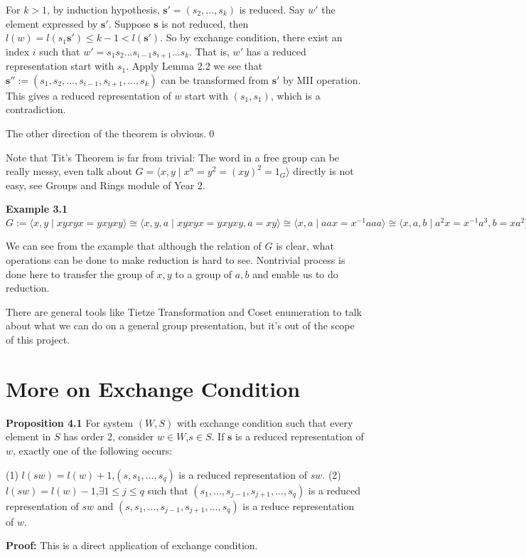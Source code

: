 \documentclass[../main.tex]{subfiles}
\begin{document}
For $k>1$, by induction hypothesis, $\mathbf{s'}=(s_2,...,s_k)$ is reduced. Say $w'$ the element expressed by $\mathbf{s'}$. Suppose $\mathbf{s}$ is not reduced, then $l(w)=l(s_1\mathbf{s'})\le k-1 < l(\mathbf{s'})$. So by exchange condition, there exist an index $i$ such that $w'=s_1s_2...s_{i-1}s_{i+1}...s_k$. That is, $w'$ has a reduced representation start with $s_1$. Apply Lemma 2.2 we see that $\mathbf{s''}:=(s_1,s_2,...,s_{i-1},s_{i+1},...,s_k)$ can be transformed from $\mathbf{s'}$ by MII operation. This gives a reduced representation of $w$ start with $(s_1,s_1)$, which is a contradiction. 

The other direction of the theorem is obvious.\qed

\vspace{\baselineskip}
Note that Tit's Theorem is far from trivial: The word in a free group can be really messy, even talk about $G=\langle x,y \mid x^n=y^2=(xy)^2=1_G \rangle$ directly is not easy, see Groups and Rings module of Year 2. 

\vspace{\baselineskip}
\noindent \textbf{Example 3.1} $G:=\langle x,y \mid xyxyx=yxyxy \rangle \cong \langle x,y,a \mid xyxyx=yxyxy,a=xy\rangle \cong \langle x,a \mid aax=x^{-1} aaa\rangle \cong \langle x,a,b \mid a^2x=x^{-1}a^3,b=xa^2\rangle \cong \langle a,b \mid a^2=b^5\rangle$

We can see from the example that although the relation of $G$ is clear, what operations can be done to make reduction is hard to see. Nontrivial process is done here to transfer the group of $x,y$ to a group of $a,b$ and enable us to do reduction.

There are general tools like Tietze Transformation and Coset enumeration to talk about what we can do on a general group presentation, but it's out of the scope of this project.

\section{More on Exchange Condition}
\noindent \textbf{Proposition 4.1} For system $(W,S)$ with exchange condition such that every element in $S$ has order 2, consider $w\in W$,$s\in S$. If $\mathbf{s}$ is a reduced representation of $w$, exactly one of the following occurs:

(1) $l(sw)=l(w)+1$,$(s,s_1,...,s_q)$ is a reduced representation of $sw$.
(2) $l(sw)=l(w)-1$,$\exists 1\le j \le q$  such that $(s_1,...,s_{j-1},s_{j+1},...,s_q)$ is a reduced representation of $sw$ and $(s,s_1,...,s_{j-1},s_{j+1},...,s_q)$ is a reduce representation of $w$. 

\noindent \textbf{Proof:} This is a direct application of exchange condition.
\end{document}
